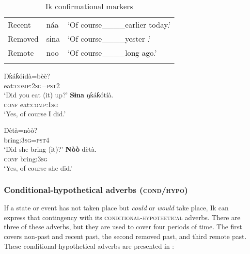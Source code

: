 \begin{table}
\caption{Ik confirmational markers}
\label{tab:adv:conf}


\begin{tabularx}{.66\textwidth}{XXl}
\lsptoprule

Recent & náa & ‘Of course\_\_\_\_earlier today.’\\
Removed & sɨna & ‘Of course\_\_\_\_yester-.’\\
Remote & noo & ‘Of course\_\_\_\_long ago.’\\
\lspbottomrule
\end{tabularx}
\end{table}



\ea\label{ex:adv:11}
  \ea
  \gll Ŋƙáƙóídà=bèè?  \\
eat:\textsc{comp:2sg=pst2}     \\
  \glt ‘Did you eat (it) up?’
  \ex
  \gll \textbf{Sɨna}   ŋƙáƙótíà.\\
\textsc{conf}   eat\textsc{:comp:1sg}    \\
  \glt ‘Yes, of course I did.’
  \z
\z





\ea\label{ex:adv:12}
  \ea
  \gll Dètà=nòò?      \\
bring:\textsc{3sg=pst4}    \\
  \glt ‘Did she bring (it)?’    
  \ex
  \gll \textbf{Nòò}   dètà.  \\
     \textsc{conf}   bring:\textsc{3sg}    \\
  \glt ‘Yes, of course she did.’
  \z
\z





\subsubsection{Conditional-hypothetical adverbs (\textsc{cond}/\textsc{hypo})}\label{sec:9.4.4}

If a state or event has not taken place but \textit{could} or \textit{would} take place, Ik can express that contingency with its \textsc{conditional-hypothetical} adverbs. There are three of these adverbs, but they are used to cover four periods of time. The first  covers non-past and recent past, the second removed past, and third remote past. These conditional-hypothetical adverbs are presented in :


